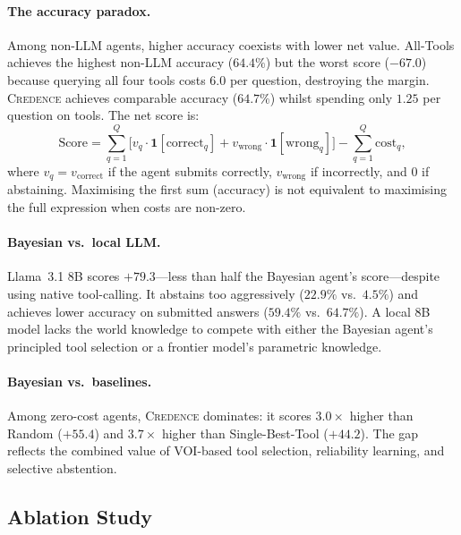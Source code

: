 \documentclass[11pt]{article}
\newcommand{\credence}{\textsc{Credence}}
\begin{document}
\paragraph{The accuracy paradox.}
Among non-LLM agents, higher accuracy coexists with lower net value. All-Tools achieves the highest non-LLM accuracy ($64.4\%$) but the worst score ($-67.0$) because querying all four tools costs $6.0$ per question, destroying the margin. \credence{} achieves comparable accuracy ($64.7\%$) whilst spending only $1.25$ per question on tools. The net score is:
\begin{equation}
  \text{Score} = \sum_{q=1}^Q \bigl[v_q \cdot \mathbf{1}[\text{correct}_q] + v_{\text{wrong}} \cdot \mathbf{1}[\text{wrong}_q]\bigr] - \sum_{q=1}^Q \text{cost}_q,
\end{equation}
where $v_q = v_{\text{correct}}$ if the agent submits correctly, $v_{\text{wrong}}$ if incorrectly, and $0$ if abstaining. Maximising the first sum (accuracy) is not equivalent to maximising the full expression when costs are non-zero.

\paragraph{Bayesian vs.\ local LLM.}
Llama~3.1 8B scores $+79.3$---less than half the Bayesian agent's score---despite using native tool-calling. It abstains too aggressively ($22.9\%$ vs.\ $4.5\%$) and achieves lower accuracy on submitted answers ($59.4\%$ vs.\ $64.7\%$). A local 8B model lacks the world knowledge to compete with either the Bayesian agent's principled tool selection or a frontier model's parametric knowledge.

\paragraph{Bayesian vs.\ baselines.}
Among zero-cost agents, \credence{} dominates: it scores $3.0\times$ higher than Random ($+55.4$) and $3.7\times$ higher than Single-Best-Tool ($+44.2$). The gap reflects the combined value of VOI-based tool selection, reliability learning, and selective abstention.

\subsection{Ablation Study}
\end{document}
